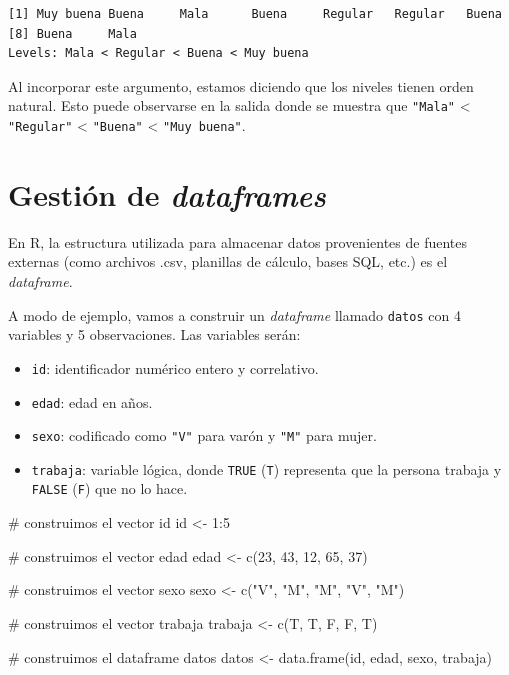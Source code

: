 \documentclass[
  spanish,
  letterpaper,
  DIV=11,
  numbers=noendperiod]{scrreprt}
\newenvironment{Shaded}{\begin{snugshade}}{\end{snugshade}}
\newcommand{\CommentTok}[1]{\textcolor[rgb]{0.37,0.37,0.37}{#1}}
\newcommand{\DecValTok}[1]{\textcolor[rgb]{0.68,0.00,0.00}{#1}}
\newcommand{\FunctionTok}[1]{\textcolor[rgb]{0.28,0.35,0.67}{#1}}
\newcommand{\NormalTok}[1]{\textcolor[rgb]{0.00,0.23,0.31}{#1}}
\newcommand{\OtherTok}[1]{\textcolor[rgb]{0.00,0.23,0.31}{#1}}
\newcommand{\SpecialCharTok}[1]{\textcolor[rgb]{0.37,0.37,0.37}{#1}}
\newcommand{\StringTok}[1]{\textcolor[rgb]{0.13,0.47,0.30}{#1}}
\begin{document}
\begin{verbatim}
[1] Muy buena Buena     Mala      Buena     Regular   Regular   Buena    
[8] Buena     Mala     
Levels: Mala < Regular < Buena < Muy buena
\end{verbatim}

Al incorporar este argumento, estamos diciendo que los niveles tienen
orden natural. Esto puede observarse en la salida donde se muestra que
\texttt{"Mala"} \textless{} \texttt{"Regular"} \textless{}
\texttt{"Buena"} \textless{} \texttt{"Muy\ buena"}.

\section{\texorpdfstring{Gestión de
\emph{dataframes}}{Gestión de dataframes}}\label{gestiuxf3n-de-dataframes}

En R, la estructura utilizada para almacenar datos provenientes de
fuentes externas (como archivos .csv, planillas de cálculo, bases SQL,
etc.) es el \emph{dataframe}.

A modo de ejemplo, vamos a construir un \emph{dataframe} llamado
\texttt{datos} con 4 variables y 5 observaciones. Las variables serán:

\begin{itemize}
\item
  \texttt{id}: identificador numérico entero y correlativo.
\item
  \texttt{edad}: edad en años.
\item
  \texttt{sexo}: codificado como \texttt{"V"} para varón y \texttt{"M"}
  para mujer.
\item
  \texttt{trabaja}: variable lógica, donde \texttt{TRUE} (\texttt{T})
  representa que la persona trabaja y \texttt{FALSE} (\texttt{F}) que no
  lo hace.
\end{itemize}

\begin{Shaded}
\begin{Highlighting}[]
\CommentTok{\# construimos el vector id}
\NormalTok{id }\OtherTok{\textless{}{-}} \DecValTok{1}\SpecialCharTok{:}\DecValTok{5}

\CommentTok{\# construimos el vector edad}
\NormalTok{edad }\OtherTok{\textless{}{-}} \FunctionTok{c}\NormalTok{(}\DecValTok{23}\NormalTok{, }\DecValTok{43}\NormalTok{, }\DecValTok{12}\NormalTok{, }\DecValTok{65}\NormalTok{, }\DecValTok{37}\NormalTok{)}

\CommentTok{\# construimos el vector sexo}
\NormalTok{sexo }\OtherTok{\textless{}{-}} \FunctionTok{c}\NormalTok{(}\StringTok{"V"}\NormalTok{, }\StringTok{"M"}\NormalTok{, }\StringTok{"M"}\NormalTok{, }\StringTok{"V"}\NormalTok{, }\StringTok{"M"}\NormalTok{)}

\CommentTok{\# construimos el vector trabaja}
\NormalTok{trabaja }\OtherTok{\textless{}{-}} \FunctionTok{c}\NormalTok{(T, T, F, F, T)}

\CommentTok{\# construimos el dataframe datos}
\NormalTok{datos }\OtherTok{\textless{}{-}} \FunctionTok{data.frame}\NormalTok{(id, edad, sexo, trabaja)}
\end{Highlighting}
\end{Shaded}
\end{document}
